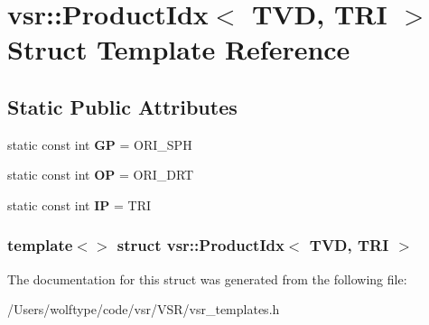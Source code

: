 \hypertarget{structvsr_1_1_product_idx_3_01_t_v_d_00_01_t_r_i_01_4}{\section{vsr\-:\-:Product\-Idx$<$ T\-V\-D, T\-R\-I $>$ Struct Template Reference}
\label{structvsr_1_1_product_idx_3_01_t_v_d_00_01_t_r_i_01_4}
}
\subsection*{Static Public Attributes}
\begin{DoxyCompactItemize}
\item 
\hypertarget{structvsr_1_1_product_idx_3_01_t_v_d_00_01_t_r_i_01_4_afe1ed8f3387879428ab852a8ae41dc2b}{static const int {\bfseries G\-P} = O\-R\-I\-\_\-\-S\-P\-H}\label{structvsr_1_1_product_idx_3_01_t_v_d_00_01_t_r_i_01_4_afe1ed8f3387879428ab852a8ae41dc2b}

\item 
\hypertarget{structvsr_1_1_product_idx_3_01_t_v_d_00_01_t_r_i_01_4_a3314bdb79fc42799095dd86a9447cccf}{static const int {\bfseries O\-P} = O\-R\-I\-\_\-\-D\-R\-T}\label{structvsr_1_1_product_idx_3_01_t_v_d_00_01_t_r_i_01_4_a3314bdb79fc42799095dd86a9447cccf}

\item 
\hypertarget{structvsr_1_1_product_idx_3_01_t_v_d_00_01_t_r_i_01_4_a9bcb558400ce3bfec492b78443c4c28f}{static const int {\bfseries I\-P} = T\-R\-I}\label{structvsr_1_1_product_idx_3_01_t_v_d_00_01_t_r_i_01_4_a9bcb558400ce3bfec492b78443c4c28f}

\end{DoxyCompactItemize}
\subsubsection*{template$<$$>$ struct vsr\-::\-Product\-Idx$<$ T\-V\-D, T\-R\-I $>$}



The documentation for this struct was generated from the following file\-:\begin{DoxyCompactItemize}
\item 
/\-Users/wolftype/code/vsr/\-V\-S\-R/vsr\-\_\-templates.\-h\end{DoxyCompactItemize}
